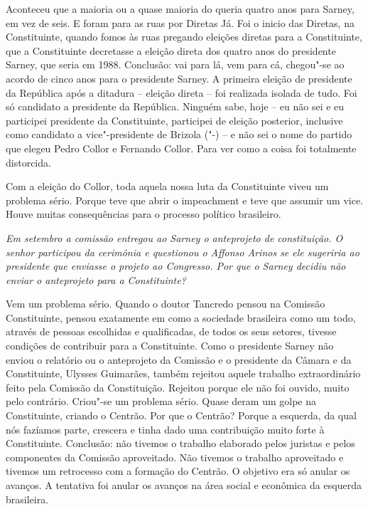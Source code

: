 Aconteceu que a maioria ou a quase maioria do  queria quatro anos
para Sarney, em vez de seis. E foram para as ruas por Diretas Já. Foi o
inicio das Diretas, na Constituinte, quando fomos às ruas pregando
eleições diretas para a Constituinte, que a Constituinte decretasse a
eleição direta dos quatro anos do presidente Sarney, que seria em 1988.
Conclusão: vai para lá, vem para cá, chegou"-se ao acordo de cinco anos
para o presidente Sarney. A primeira eleição de presidente da República
após a ditadura -- eleição direta -- foi realizada isolada de tudo. Foi
só candidato a presidente da República. Ninguém sabe, hoje -- eu não sei
e eu participei presidente da Constituinte, participei de eleição
posterior, inclusive como candidato a vice"-presidente de Brizola
("-) -- e não sei o nome do partido que elegeu Pedro Collor e
Fernando Collor. Para ver como a coisa foi totalmente distorcida.

Com a eleição do Collor, toda aquela nossa luta da Constituinte viveu um
problema sério. Porque teve que abrir o impeachment e teve que assumir
um vice. Houve muitas consequências para o processo político brasileiro.

\medskip

\emph{Em setembro a comissão entregou ao Sarney o anteprojeto de
constituição. O senhor participou da cerimônia e questionou o Affonso
Arinos se ele sugeriria ao presidente que enviasse o projeto ao
Congresso. Por que o Sarney decidiu não enviar o anteprojeto para a
Constituinte?}

Vem um problema sério. Quando o doutor Tancredo pensou na
Comissão Constituinte, pensou exatamente em como a sociedade brasileira
como um todo, através de pessoas escolhidas e qualificadas, de todos os
seus setores, tivesse condições de contribuir para a Constituinte. Como
o presidente Sarney não enviou o relatório ou o anteprojeto da Comissão
e o presidente da Câmara e da Constituinte, Ulysses Guimarães, também
rejeitou aquele trabalho extraordinário feito pela Comissão da
Constituição. Rejeitou porque ele não foi ouvido, muito pelo contrário.
Criou"-se um problema sério. Quase deram um golpe na Constituinte,
criando o Centrão. Por que o Centrão? Porque a esquerda, da qual nós
fazíamos parte, crescera e tinha dado uma contribuição muito forte à
Constituinte. Conclusão: não tivemos o trabalho elaborado pelos juristas
e pelos componentes da Comissão aproveitado. Não tivemos o trabalho
aproveitado e tivemos um retrocesso com a formação do Centrão. O
objetivo era só anular os avanços. A tentativa foi anular os avanços na
área social e econômica da esquerda brasileira.

